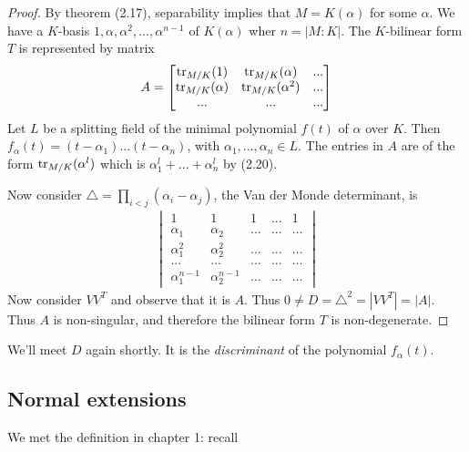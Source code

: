 \documentclass[a4paper]{article}
\begin{document}
\begin{proof}
By theorem (2.17), separability implies that $M=K(\alpha)$ for some $\alpha$. We have a $K$-basis $1,\alpha,\alpha^2,...,\alpha^{n-1}$ of $K(\alpha)$ wher $n=|M:K|$. The $K$-bilinear form $T$ is represented by matrix
\begin{equation*}
\begin{aligned}
A = \begin{bmatrix}
\operatorname{tr}_{M/K}(1) & \operatorname{tr}_{M/K}(\alpha) & ...\\
\operatorname{tr}_{M/K}(\alpha) & \operatorname{tr}_{M/K}(\alpha^2) & ...\\
... & ... & ...
\end{bmatrix}
\end{aligned}
\end{equation*}
Let $L$ be a splitting field of the minimal polynomial $f(t)$ of $\alpha$ over $K$. Then $f_\alpha(t) = (t-\alpha_1) ... (t-\alpha_n)$, with $\alpha_1,...,\alpha_n \in L$. The entries in $A$ are of the form $\operatorname{tr}_{M/K} (\alpha^l)$ which is $\alpha_1^l+...+\alpha_n^l$ by (2.20).

Now consider $\triangle = \prod_{i < j} (\alpha_i - \alpha_j)$, the Van der Monde determinant, is 
\begin{equation*}
\begin{aligned}
\begin{vmatrix}
1 & 1 & 1 & ... & 1\\
\alpha_1 & \alpha_2 & ... & ... & ...\\
\alpha_1^2 & \alpha_2^2 & ... & ... & ...\\
... & ... & ... & ... & ...\\
\alpha_1^{n-1} & \alpha_2^{n-1} & ... & ... & ...
\end{vmatrix}
\end{aligned}
\end{equation*}
Now consider $VV^T$ and observe that it is $A$. Thus $0 \neq D = \triangle^2 = |VV^T| = |A|$. Thus $A$ is non-singular, and therefore the bilinear form $T$ is non-degenerate.
\end{proof}

\begin{rem}
We'll meet $D$ again shortly. It is the \emph{discriminant} of the polynomial $f_\alpha(t)$.
\end{rem}

\subsection{Normal extensions}
We met the definition in chapter 1: recall
\end{document}
